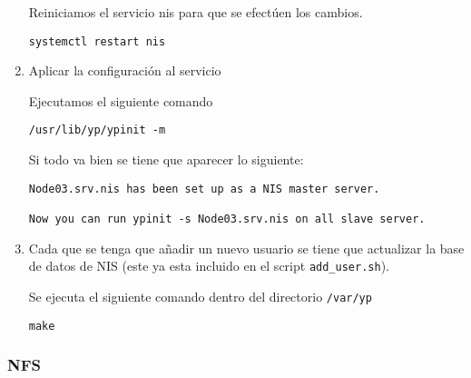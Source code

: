 \documentclass[../main.tex]{subfiles}
\begin{document}
\begin{enumerate}
  Reiniciamos el servicio nis para que se efectúen los cambios.

  \begin{listing}[H]
  \begin{verbatim}
systemctl restart nis
\end{verbatim}
\end{listing}

  
\item Aplicar la configuración al servicio

  Ejecutamos el siguiente comando

  \begin{listing}[H]
  \begin{verbatim}
/usr/lib/yp/ypinit -m
\end{verbatim}
\end{listing}

  Si todo va bien se tiene que aparecer lo siguiente:

  \begin{listing}[H]
  \begin{verbatim}
Node03.srv.nis has been set up as a NIS master server.

Now you can run ypinit -s Node03.srv.nis on all slave server.
\end{verbatim}
\end{listing}
  
\item Cada que se tenga  que añadir un nuevo usuario se
  tiene que actualizar la base de datos de NIS\@
  (este ya esta incluido en el script \texttt{add_user.sh}).

  Se ejecuta el siguiente comando dentro del directorio
  \texttt{/var/yp}

  \begin{listing}[H]
  \begin{verbatim}
make
\end{verbatim}
\end{listing}
  
\end{enumerate}

\subsubsection{NFS}\label{sec:nfs}
\end{document}
